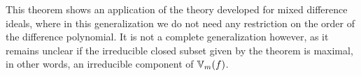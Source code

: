 This theorem shows an application of the theory developed for mixed difference ideals, where in this generalization we do not need any restriction on the order of the difference polynomial.
It is not a complete generalization however, as it remains unclear if the irreducible closed subset given by the theorem is maximal, in other words, an irreducible component of $\mathbb{V}_m(f)$.



